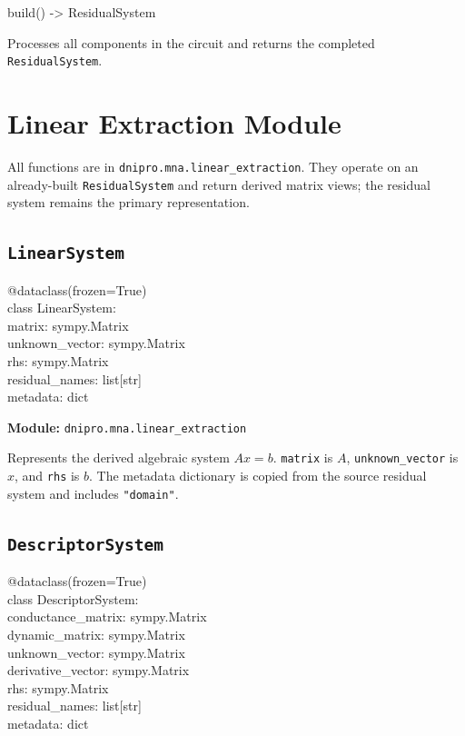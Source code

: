 \documentclass[11pt,a4paper]{article}
\newcommand{\code}[1]{\texttt{#1}}
\newenvironment{apisig}{%
  \begin{trivlist}\item\relax\ttfamily\small
}{%
  \end{trivlist}
}
\begin{document}
\begin{apisig}
build() -> ResidualSystem
\end{apisig}
Processes all components in the circuit and returns the completed
\code{ResidualSystem}.

\section{Linear Extraction Module}
\label{sec:api-linear-extraction}

All functions are in \code{dnipro.mna.linear\_extraction}. They operate on an
already-built \code{ResidualSystem} and return derived matrix views; the residual
system remains the primary representation.

\subsection{\texttt{LinearSystem}}
\label{api:linearsystem}

\begin{apisig}
@dataclass(frozen=True) \\
class LinearSystem: \\
\quad matrix: sympy.Matrix \\
\quad unknown\_vector: sympy.Matrix \\
\quad rhs: sympy.Matrix \\
\quad residual\_names: list[str] \\
\quad metadata: dict
\end{apisig}

\textbf{Module:} \code{dnipro.mna.linear\_extraction}

Represents the derived algebraic system \(A x = b\).
\code{matrix} is \(A\), \code{unknown\_vector} is \(x\), and \code{rhs} is \(b\).
The metadata dictionary is copied from the source residual system and includes
\code{"domain"}.

\subsection{\texttt{DescriptorSystem}}
\label{api:descriptorsystem}

\begin{apisig}
@dataclass(frozen=True) \\
class DescriptorSystem: \\
\quad conductance\_matrix: sympy.Matrix \\
\quad dynamic\_matrix: sympy.Matrix \\
\quad unknown\_vector: sympy.Matrix \\
\quad derivative\_vector: sympy.Matrix \\
\quad rhs: sympy.Matrix \\
\quad residual\_names: list[str] \\
\quad metadata: dict
\end{apisig}
\end{document}
